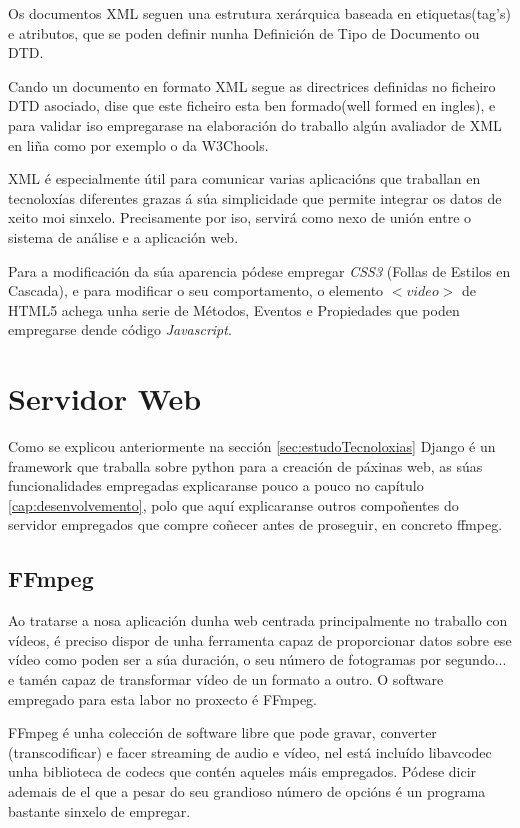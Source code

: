     Os documentos XML seguen una estrutura xerárquica baseada en etiquetas(tag's) e atributos,
    que se poden definir nunha Definición de Tipo de Documento ou DTD. \cite{dtd-web-page}
    
    Cando un documento en formato XML segue as directrices definidas no ficheiro DTD asociado,
    dise que este ficheiro esta ben formado(well formed en ingles), e para validar iso empregarase
    na elaboración do traballo algún avaliador de XML en liña como por exemplo o da W3Chools.\cite{xml-validator}
    
    XML é especialmente útil para comunicar varias aplicacións que traballan en tecnoloxías 
    diferentes grazas á súa simplicidade que permite integrar os datos de xeito moi sinxelo. Precisamente
    por iso, servirá como nexo de unión entre o sistema de análise e a aplicación web. 
    
    Para a modificación da súa aparencia pódese empregar \emph{CSS3} (Follas de Estilos en 
    Cascada), e para modificar o seu comportamento, o elemento $<video>$ de HTML5 achega
    unha serie de Métodos, Eventos e Propiedades\cite{w3school-video-events} que poden
    empregarse dende código \emph{Javascript}.
    
\section{Servidor Web}
    Como se explicou anteriormente na sección \ref{sec:estudoTecnoloxias} Django é un framework
    que traballa sobre python para a creación de páxinas web, as súas funcionalidades empregadas
    explicaranse pouco a pouco no capítulo \ref{cap:desenvolvemento}, polo que aquí explicaranse
    outros compoñentes do servidor empregados que compre coñecer antes de proseguir, en concreto 
    ffmpeg.
    
\subsection{FFmpeg}
    Ao tratarse a nosa aplicación dunha web centrada principalmente no traballo con vídeos, é 
    preciso dispor de unha ferramenta capaz de proporcionar datos sobre ese vídeo como poden ser 
    a súa duración, o seu número de fotogramas por segundo... e tamén capaz de transformar vídeo
    de un formato a outro. O software empregado para esta labor no proxecto é FFmpeg.

    FFmpeg é unha colección de software libre que pode gravar, converter (transcodificar) e facer
    streaming de audio e vídeo, nel está incluído libavcodec unha biblioteca de codecs que contén 
    aqueles máis empregados. Pódese dicir ademais de el que a pesar do seu grandioso número de 
    opcións é un programa bastante sinxelo de empregar.
    